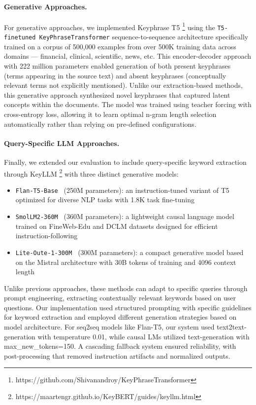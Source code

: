 \documentclass[sigconf]{acmart}
\begin{document}
\paragraph{Generative Approaches.}
For generative approaches, we implemented Keyphrase T5 \footnote{https://github.com/Shivanandroy/KeyPhraseTransformer} using the \texttt{T5-finetuned KeyPhraseTransformer} sequence-to-sequence architecture \cite{DBLP:journals/jmlr/RaffelSRLNMZLL20} specifically trained on a corpus of 500,000 examples from over 500K training data across domains — financial, clinical, scientific, news, etc. This encoder-decoder approach with 222 million parameters enabled generation of both present keyphrases (terms appearing in the source text) and absent keyphrases (conceptually relevant terms not explicitly mentioned). Unlike our extraction-based methods, this generative approach synthesized novel keyphrases that captured latent concepts within the documents. The model was trained using teacher forcing with cross-entropy loss, allowing it to learn optimal n-gram length selection automatically rather than relying on pre-defined configurations.

\paragraph{Query-Specific LLM Approaches.}
Finally, we extended our evaluation to include query-specific keyword extraction through KeyLLM \footnote{https://maartengr.github.io/KeyBERT/guides/keyllm.html} with three distinct generative models:
\begin{itemize}
    \item \texttt{Flan-T5-Base \cite{DBLP:journals/corr/abs-2210-11416}} (250M parameters): an instruction-tuned variant of T5 optimized for diverse NLP tasks with 1.8K task fine-tuning
    \item \texttt{SmolLM2-360M \cite{DBLP:journals/corr/abs-2502-02737}} (360M parameters): a lightweight causal language model trained on FineWeb-Edu and DCLM datasets designed for efficient instruction-following
    \item \texttt{Lite-Oute-1-300M \cite{OuteAI_Lite_Oute_1_300M_2024}} (300M parameters): a compact generative model based on the Mistral architecture with 30B tokens of training and 4096 context length
\end{itemize}

Unlike previous approaches, these methods can adapt to specific queries through prompt engineering, extracting contextually relevant keywords based on user questions. Our implementation used structured prompting with specific guidelines for keyword extraction and employed different generation strategies based on model architecture. For seq2seq models like Flan-T5, our system used text2text-generation with temperature 0.01, while causal LMs utilized text-generation with max\_new\_tokens=150. A cascading fallback system ensured reliability, with post-processing that removed instruction artifacts and normalized outputs.
\end{document}
